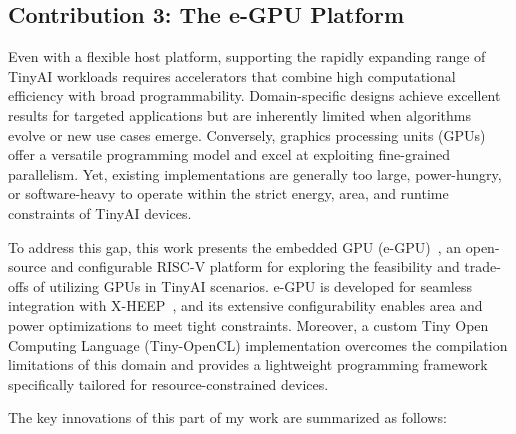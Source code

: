         \subsection*{Contribution 3: The e-GPU Platform}

            Even with a flexible host platform, supporting the rapidly expanding range of TinyAI workloads requires accelerators that combine high computational efficiency with broad programmability. Domain-specific designs achieve excellent results for targeted applications but are inherently limited when algorithms evolve or new use cases emerge. Conversely, graphics processing units (GPUs) offer a versatile programming model and excel at exploiting fine-grained parallelism. Yet, existing implementations are generally too large, power-hungry, or software-heavy to operate within the strict energy, area, and runtime constraints of TinyAI devices.

            To address this gap, this work presents the embedded GPU (\mbox{e-GPU})~\cite{e-gpu}, an open-source and configurable RISC-V platform for exploring the feasibility and trade-offs of utilizing GPUs in TinyAI scenarios. \mbox{e-GPU} is developed for seamless integration with \mbox{X-HEEP}~\cite{x-heep}, and its extensive configurability enables area and power optimizations to meet tight constraints. Moreover, a custom Tiny Open Computing Language (Tiny-OpenCL) implementation overcomes the compilation limitations of this domain and provides a lightweight programming framework specifically tailored for resource-constrained devices.
        
            The key innovations of this part of my work are summarized as follows:

